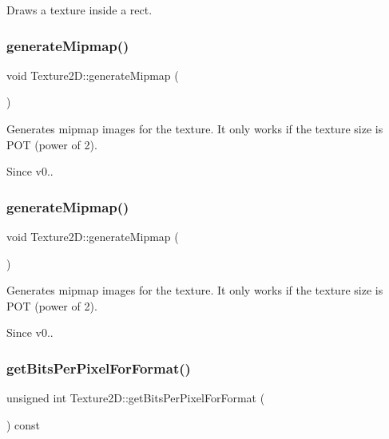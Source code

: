 Draws a texture inside a rect. \mbox{\label{classTexture2D_a91bccde122da02002c5518480474c177}} 
\subsubsection{\texorpdfstring{generate\+Mipmap()}{generateMipmap()}\hspace{0.1cm}{\footnotesize\ttfamily [1/2]}}
{\footnotesize\ttfamily void Texture2\+D\+::generate\+Mipmap (\begin{DoxyParamCaption}{ }\end{DoxyParamCaption})}

Generates mipmap images for the texture. It only works if the texture size is P\+OT (power of 2). \begin{DoxySince}{Since}
v0.. 
\end{DoxySince}
\mbox{\label{classTexture2D_a91bccde122da02002c5518480474c177}} 
\subsubsection{\texorpdfstring{generate\+Mipmap()}{generateMipmap()}\hspace{0.1cm}{\footnotesize\ttfamily [2/2]}}
{\footnotesize\ttfamily void Texture2\+D\+::generate\+Mipmap (\begin{DoxyParamCaption}{ }\end{DoxyParamCaption})}

Generates mipmap images for the texture. It only works if the texture size is P\+OT (power of 2). \begin{DoxySince}{Since}
v0.. 
\end{DoxySince}
\mbox{\label{classTexture2D_af29476c171cc5167c8392265f80fb9af}} 
\subsubsection{\texorpdfstring{get\+Bits\+Per\+Pixel\+For\+Format()}{getBitsPerPixelForFormat()}\hspace{0.1cm}{\footnotesize\ttfamily [1/4]}}
{\footnotesize\ttfamily unsigned int Texture2\+D\+::get\+Bits\+Per\+Pixel\+For\+Format (\begin{DoxyParamCaption}{ }\end{DoxyParamCaption}) const}

